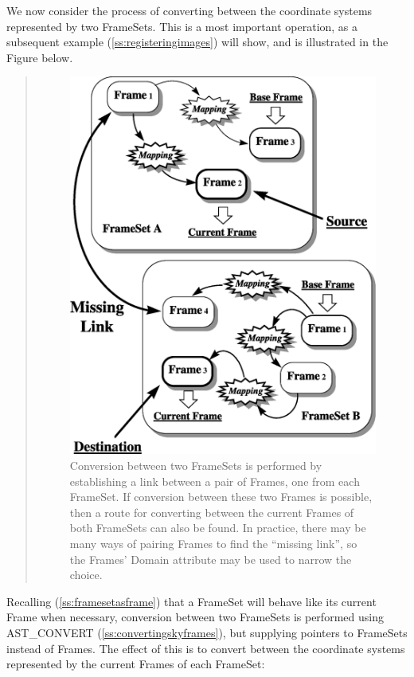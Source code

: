 \documentclass[twoside,11pt]{article}
\newcommand{\htmlref}[2]{#1}
\newcommand{\secref}[1]{\S\ref{#1}}
\renewcommand{\secref}[1]{\ref{#1}}
\begin{document}
\begin{htmlonly}
   We now consider the process of converting between the coordinate
   systems represented by two FrameSets. This is a most important
   operation, as a subsequent example (\secref{ss:registeringimages})
   will show, and is illustrated in the Figure below.
   \begin{quote}
   \begin{figure}
   \label{fig:fsconvert}
   \includegraphics[scale=1.0]{sun210_figures/fsalign.eps}
   \caption{Conversion between two FrameSets is performed by establishing
   a link between a pair of Frames, one from each FrameSet. If conversion
   between these two Frames is possible, then a route for converting
   between the current Frames of both FrameSets can also be found. In
   practice, there may be many ways of pairing Frames to find the
   ``missing link'', so the Frames' Domain attribute may be used to
   narrow the choice.}
   \end{figure}
   \end{quote}
\end{htmlonly}
Recalling (\secref{ss:framesetasframe}) that a FrameSet will behave
like its current \htmlref{Frame}{Frame} when necessary, conversion between two
FrameSets is performed using \htmlref{AST\_CONVERT}{AST_CONVERT}
(\secref{ss:convertingskyframes}), but supplying pointers to FrameSets
instead of Frames. The effect of this is to convert between the
coordinate systems represented by the current Frames of each FrameSet:
\end{document}

